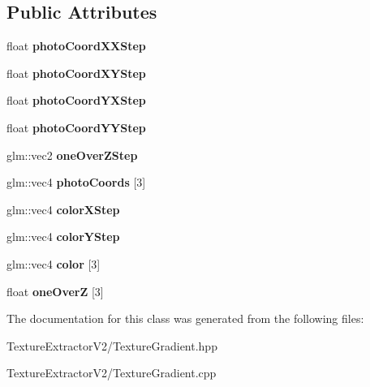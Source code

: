 \subsection*{Public Attributes}
\begin{DoxyCompactItemize}
\item 
\hypertarget{class_texture_gradient_a34bee5b4f0894efeec794704d3fd2cec}{}float {\bfseries photo\+Coord\+X\+X\+Step}\label{class_texture_gradient_a34bee5b4f0894efeec794704d3fd2cec}

\item 
\hypertarget{class_texture_gradient_ad667fab8a0c76c19fdb5d27510b5a9ba}{}float {\bfseries photo\+Coord\+X\+Y\+Step}\label{class_texture_gradient_ad667fab8a0c76c19fdb5d27510b5a9ba}

\item 
\hypertarget{class_texture_gradient_af13ceccfc1629d08233d025c1d060992}{}float {\bfseries photo\+Coord\+Y\+X\+Step}\label{class_texture_gradient_af13ceccfc1629d08233d025c1d060992}

\item 
\hypertarget{class_texture_gradient_a12b19a4e9245a4c71f9bb1c36f40f94d}{}float {\bfseries photo\+Coord\+Y\+Y\+Step}\label{class_texture_gradient_a12b19a4e9245a4c71f9bb1c36f40f94d}

\item 
\hypertarget{class_texture_gradient_a504ba2546491bbe0eb80c9e496020aff}{}glm\+::vec2 {\bfseries one\+Over\+Z\+Step}\label{class_texture_gradient_a504ba2546491bbe0eb80c9e496020aff}

\item 
\hypertarget{class_texture_gradient_a864076b3aeea93295c0f3d262ede9fac}{}glm\+::vec4 {\bfseries photo\+Coords} \mbox{[}3\mbox{]}\label{class_texture_gradient_a864076b3aeea93295c0f3d262ede9fac}

\item 
\hypertarget{class_texture_gradient_ac3a61d0f068bf9e1716d4a6043fb39c3}{}glm\+::vec4 {\bfseries color\+X\+Step}\label{class_texture_gradient_ac3a61d0f068bf9e1716d4a6043fb39c3}

\item 
\hypertarget{class_texture_gradient_ac34b317ff76b5493b159b3491df26839}{}glm\+::vec4 {\bfseries color\+Y\+Step}\label{class_texture_gradient_ac34b317ff76b5493b159b3491df26839}

\item 
\hypertarget{class_texture_gradient_aad5614bae7a7361a1b82b69d9b082ea6}{}glm\+::vec4 {\bfseries color} \mbox{[}3\mbox{]}\label{class_texture_gradient_aad5614bae7a7361a1b82b69d9b082ea6}

\item 
\hypertarget{class_texture_gradient_af7d99a3ca4515f65a8afeb5139cd2d8e}{}float {\bfseries one\+Over\+Z} \mbox{[}3\mbox{]}\label{class_texture_gradient_af7d99a3ca4515f65a8afeb5139cd2d8e}

\end{DoxyCompactItemize}


The documentation for this class was generated from the following files\+:\begin{DoxyCompactItemize}
\item 
Texture\+Extractor\+V2/Texture\+Gradient.\+hpp\item 
Texture\+Extractor\+V2/Texture\+Gradient.\+cpp\end{DoxyCompactItemize}
